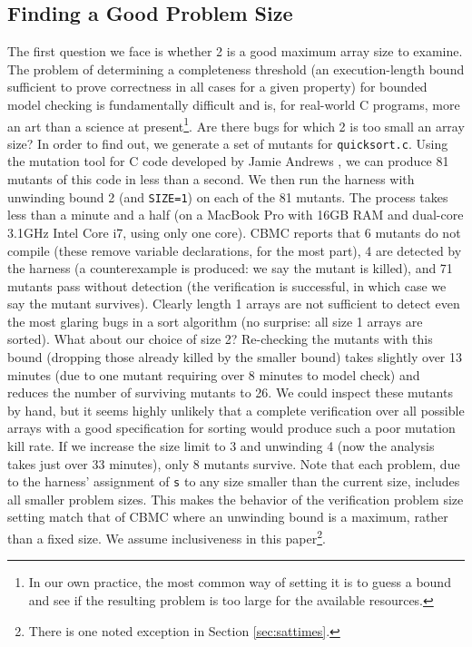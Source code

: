 \documentclass{svjour3}
\begin{document}
\subsection{Finding a Good Problem Size}
\label{sec:unwind}

The first question we face is whether 2 is a good maximum array
size to examine.  The problem of determining a completeness
  threshold (an execution-length bound sufficient to prove correctness
in all cases for a given property) for bounded model checking is
fundamentally difficult \cite{CTDaniel} and is, for real-world C
programs, more an art than a science at present\footnote{In our own
  practice, the most common way of setting it is to guess a bound and
  see if the resulting problem is too large for the available
  resources.}.  Are there bugs for which 2 is too small
an array size?  In order to find out, we generate a set of mutants for
{\tt quicksort.c}.  Using the mutation tool for C code developed by
Jamie Andrews \cite{mutant}, we can produce 81 mutants of this code in
less than a second.  We then run the harness with unwinding bound 2
(and {\tt SIZE=1}) on each of the 81 mutants.  The process takes less
than a minute and a half (on a MacBook Pro with 16GB RAM and dual-core 3.1GHz Intel
Core i7, using only one core).  CBMC reports that 6 mutants do not
compile (these remove variable declarations, for the most part), 4 are
detected by the harness (a counterexample is produced: we say the
mutant is killed), and 71 mutants pass without detection (the
verification is successful, in which case we say the mutant survives).
Clearly length 1 arrays are not sufficient to detect even the most
glaring bugs in a sort algorithm (no surprise: all size 1 arrays are
sorted).  What about our choice of size 2?  Re-checking the mutants
with this bound
(dropping those already killed by the smaller bound) takes slightly
over 13 minutes (due to one mutant requiring over 8 minutes
to model check) and reduces the number of surviving mutants to 26.  We
could inspect these mutants by hand, but it seems highly unlikely that
a complete verification over all possible arrays with a good
specification for sorting would produce such a poor mutation kill rate.
If we increase the size limit to 3 and unwinding 4 (now the analysis takes just over 33
minutes), only 8 mutants survive.  Note that each problem, due to the
harness' assignment of {\tt s} to any size smaller than the current
size, includes all smaller problem sizes. This makes the behavior of
the verification problem size setting match that of CBMC where an unwinding bound is a maximum, rather than
a fixed size.  We assume inclusiveness in this paper\footnote{There is
  one noted exception in Section \ref{sec:sattimes}.}.
\end{document}
